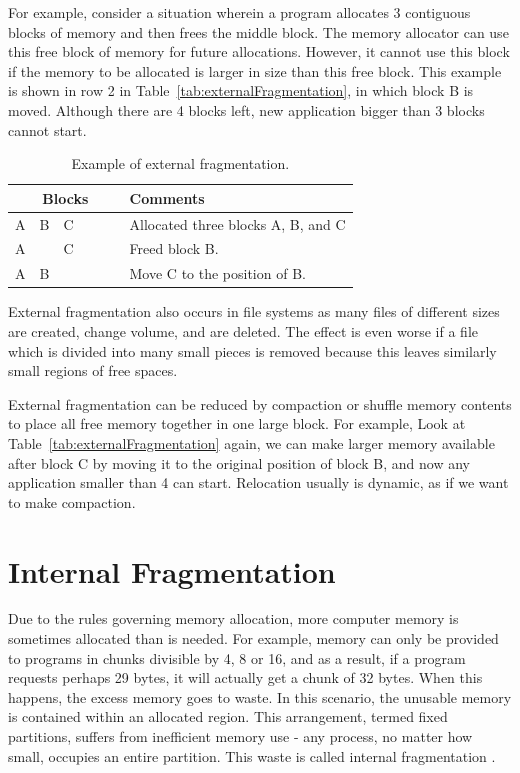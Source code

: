 \documentclass[doc,natbib,12pt]{apa6}
\begin{document}
	For example, consider a situation wherein a program allocates 3 contiguous blocks of memory and then frees the middle block. The memory allocator can use this free block of memory for future allocations. However, it cannot use this block if the memory to be allocated is larger in size than this free block. This example is shown in row 2 in Table~\vref{tab:externalFragmentation}, in which block B is moved. Although there are 4 blocks left, new application bigger than 3 blocks cannot start.
	
	\begin{table}[h]
		\centering
		\begin{tabular}{c|c|c|c|c|c|l}
			\multicolumn{6}{c|}{Blocks} & Comments \\\hline
			A & B  & C & & & & Allocated three blocks A, B, and C\\\hline
			A &     & C & & & & Freed block B. \\\hline
			A & B & & & & & Move C to the position of B. \\\hline
		\end{tabular}
		\caption{\label{tab:externalFragmentation}Example of external fragmentation.}
	\end{table}
	
	
	External fragmentation also occurs in file systems as many files of different sizes are created, change volume, and are deleted. The effect is even worse if a file which is divided into many small pieces is removed because this leaves similarly small regions of free spaces. 
	
	External fragmentation can be reduced by compaction or shuffle memory
	contents to place all free memory together in one large block. For example, Look at Table~\vref{tab:externalFragmentation} again, we can make larger memory available after block C by moving it to the original position of block B, and now any application smaller than 4 can start. Relocation usually is dynamic, as if we want to make compaction.
	
	\newpage
	\section{Internal Fragmentation} \label{chp:internalFragmentation}
	Due to the rules governing memory allocation, more computer memory is sometimes allocated than is needed. For example, memory can only be provided to programs in chunks divisible by 4, 8 or 16, and as a result, if a program requests perhaps 29 bytes, it will actually get a chunk of 32 bytes. When this happens, the excess memory goes to waste. In this scenario, the unusable memory is contained within an allocated region. This arrangement, termed fixed partitions, suffers from inefficient memory use - any process, no matter how small, occupies an entire partition. This waste is called internal fragmentation \citep{Symantec2010}.
	
\end{document}
